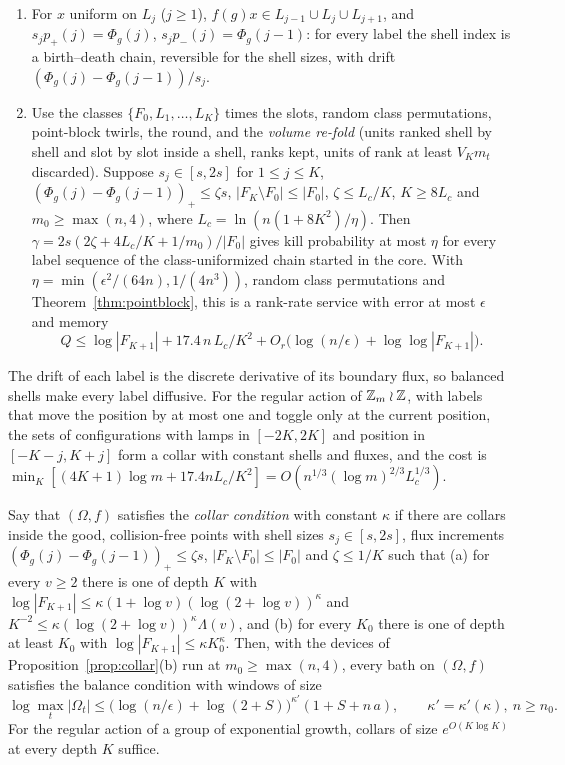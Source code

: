 \begin{proposition}\label{prop:collar}
\begin{enumerate}[label=(\alph*),itemsep=1pt]
\item For $x$ uniform on $L_j$ ($j\ge1$), $f(g)x\in L_{j-1}\cup L_j\cup L_{j+1}$, and $s_jp_+(j)=\Phi_g(j)$, $s_jp_-(j)=\Phi_g(j-1)$: for every label the
shell index is a birth--death chain, reversible for the shell sizes, with drift $(\Phi_g(j)-\Phi_g(j-1))/s_j$.
\item Use the classes $\{F_0,L_1,\dots,L_K\}$ times the slots, random class permutations, point-block twirls, the round, and the \emph{volume
re-fold} (units ranked shell by shell and slot by slot inside a shell, ranks kept, units of rank at least $V_Km_t$ discarded). Suppose
$s_j\in[s,2s]$ for $1\le j\le K$, $(\Phi_g(j)-\Phi_g(j-1))_+\le\zeta s$, $|F_K\setminus F_0|\le|F_0|$, $\zeta\le L_c/K$, $K\ge8L_c$ and $m_0\ge\max(n,4)$,
where $L_c=\ln(n(1+8K^2)/\eta)$. Then $\gamma=2s(2\zeta+4L_c/K+1/m_0)/|F_0|$ gives kill probability at most $\eta$ for every label sequence
of the class-uniformized chain started in the core. With $\eta=\min(\epsilon^2/(64n),1/(4n^3))$, random class permutations and
Theorem~\ref{thm:pointblock}, this is a rank-rate service with error at most $\epsilon$ and memory
\[
Q\le\log|F_{K+1}|+17.4\,n\,L_c/K^2+O_r\bigl(\log(n/\epsilon)+\log\log|F_{K+1}|\bigr).
\]
\end{enumerate}
\end{proposition}

The drift of each label is the discrete derivative of its boundary flux, so balanced shells make every label diffusive. For the regular action
of $\mathbb Z_m\wr\mathbb Z$, with labels that move the position by at most one and toggle only at the current position, the sets of configurations with lamps in
$[-2K,2K]$ and position in $[-K-j,K+j]$ form a collar with constant shells and fluxes, and the cost is
$\min_K[(4K+1)\log m+17.4nL_c/K^2]=O(n^{1/3}(\log m)^{2/3}L_c^{1/3})$.

\begin{theorem}\label{thm:collar-condition}
Say that $(\Omega,f)$ satisfies the \emph{collar condition} with constant $\kappa$ if there are collars inside the good, collision-free points with
shell sizes $s_j\in[s,2s]$, flux increments $(\Phi_g(j)-\Phi_g(j-1))_+\le\zeta s$, $|F_K\setminus F_0|\le|F_0|$ and $\zeta\le1/K$ such that (a) for every $v\ge2$ there is one of depth $K$ with
$\log|F_{K+1}|\le\kappa(1+\log v)(\log(2+\log v))^\kappa$ and $K^{-2}\le\kappa(\log(2+\log v))^\kappa\Lambda(v)$, and (b) for every $K_0$ there is one of
depth at least $K_0$ with $\log|F_{K+1}|\le\kappa K_0^\kappa$. Then, with the devices of Proposition~\ref{prop:collar}(b) run at $m_0\ge\max(n,4)$, every bath on $(\Omega,f)$ satisfies the balance
condition with windows of size
\[
\log\max_t|\Omega_t|\le\bigl(\log(n/\epsilon)+\log(2+S)\bigr)^{\kappa'}(1+S+n\,a),\qquad \kappa'=\kappa'(\kappa),\ n\ge n_0 .
\]
For the regular action of a group of exponential growth, collars of size $e^{O(K\log K)}$ at every depth $K$ suffice.
\end{theorem}

